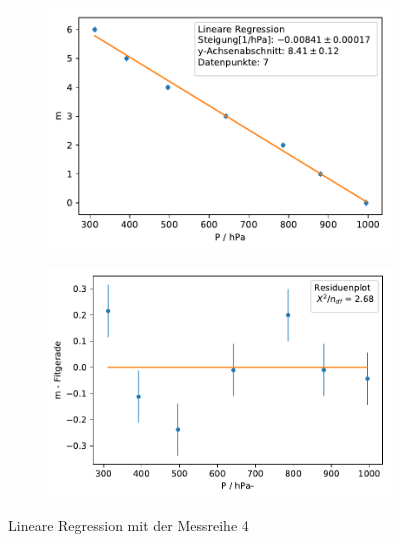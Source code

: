 \documentclass[12pt,a4paper]{article}
\begin{document}
\begin{figure}[H]
	\centering	
	\begin{subfigure}{0.49\textwidth}
		\centering
		\includegraphics[width=\textwidth]{Python/MR4_LinReg.pdf}
	\end{subfigure}
	\begin{subfigure}{0.49\textwidth}
		\centering
		\includegraphics[width=\textwidth]{Python/MR4_Residuen.pdf}
	\end{subfigure}
	\caption{Lineare Regression mit der Messreihe 4}
	\label{MR4_LinReg}
\end{figure}
\end{document}
